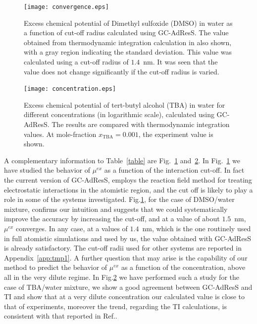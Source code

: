 \documentclass[a4paper,preprint,unsortedaddress]{revtex4-1}
\newcommand{\recheck}[1]{{\color{red} #1}}
\newcommand{\concenttba}{x_{\textrm{TBA}}}
\begin{document}
\begin{figure}
\center
\texttt{[image: convergence.eps]}
\caption{ \recheck{Excess chemical potential of Dimethyl sulfoxide (DMSO) in water as a function of cut-off radius calculated using GC-AdResS. The value obtained from thermodynamic integration calculation in also shown, with a gray region indicating the standard deviation. This value was calculated using a cut-off radius of $1.4$~nm. It was seen that the value does not change significantly if the cut-off radius is varied.}}
\label{convergence}
\end{figure}

\begin{figure}
\center
\texttt{[image: concentration.eps]}
\caption{ \recheck{Excess chemical potential of tert-butyl alcohol (TBA) in water for different concentrations (in logarithmic scale), calculated using GC-AdResS. The results are compared with thermodynamic integration values. At mole-fraction $\concenttba=0.001$, the experiment value is shown. \label{concentration}}}
\end{figure}


\recheck{A complementary information to Table~\ref{table} are 
  Fig.~\ref{convergence} and~\ref{concentration}.
  In Fig.~\ref{convergence} we have studied the behavior of $\mu^{ex}$ as a function of
  the interaction cut-off. In fact the current version of GC-AdResS,
  employs the reaction field method for treating electrostatic
  interactions in the atomistic region, and the cut off is likely to
  play a role in some of the systems investigated. Fig.\ref{convergence}, for the case of DMSO/water
  mixture, confirms our intuition and suggests that we could
  systematically improve the accuracy by increasing the cut-off,
  and at a value of about $1.5$~nm, $\mu^{ex}$ converges. In any
  case, at a values of $1.4$~nm, which is the one routinely used in
  full atomistic simulations and used by us, the
  value obtained with GC-AdResS is already satisfactory.
  The cut-off radii used for other systems are reported in Appendix~\ref{app:tmp1}.
  A further
  question that may arise is the capability of our method to predict
  the behavior of $\mu^{ex}$ as a function of the concentration, above
  all in the very dilute regime. In Fig.\ref{concentration} we have
  performed such a study for the case of TBA/water mixture, we show a
  good agreement between GC-AdResS and TI and show that at a very
  dilute concentration our calculated value is close to that of
  experiments, moreover the trend, regarding the TI calculations, is
  consistent with that reported in Ref.\cite{nico}.\\
}
\end{document}
